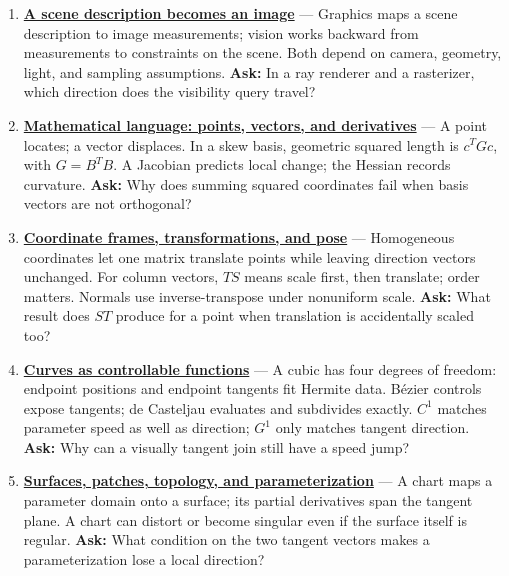 \begin{enumerate}
\def\labelenumi{\arabic{enumi}.}
\item
  \textbf{\href{Continuous\%20Notes/University\%20-\%20Worlds,\%20Images\%20and\%20Inference\%20-\%20Graphics,\%20Vision\%20and\%20Photography\#A\%20scene\%20description\%20becomes\%20an\%20image}{A scene description becomes an image}} --- Graphics maps a scene description to image measurements; vision works backward from measurements to constraints on the scene. Both depend on camera, geometry, light, and sampling assumptions. \textbf{Ask:} In a ray renderer and a rasterizer, which direction does the visibility query travel?
\item
  \textbf{\href{Continuous\%20Notes/University\%20-\%20Worlds,\%20Images\%20and\%20Inference\%20-\%20Graphics,\%20Vision\%20and\%20Photography\#Mathematical\%20language:\%20points,\%20vectors,\%20and\%20derivatives}{Mathematical language: points, vectors, and derivatives}} --- A point locates; a vector displaces. In a skew basis, geometric squared length is \(c^T Gc\), with \(G=B^TB\). A Jacobian predicts local change; the Hessian records curvature. \textbf{Ask:} Why does summing squared coordinates fail when basis vectors are not orthogonal?
\item
  \textbf{\href{Continuous\%20Notes/University\%20-\%20Worlds,\%20Images\%20and\%20Inference\%20-\%20Graphics,\%20Vision\%20and\%20Photography\#Coordinate\%20frames,\%20transformations,\%20and\%20pose}{Coordinate frames, transformations, and pose}} --- Homogeneous coordinates let one matrix translate points while leaving direction vectors unchanged. For column vectors, \(TS\) means scale first, then translate; order matters. Normals use inverse-transpose under nonuniform scale. \textbf{Ask:} What result does \(ST\) produce for a point when translation is accidentally scaled too?
\item
  \textbf{\href{Continuous\%20Notes/University\%20-\%20Worlds,\%20Images\%20and\%20Inference\%20-\%20Graphics,\%20Vision\%20and\%20Photography\#Curves\%20as\%20controllable\%20functions}{Curves as controllable functions}} --- A cubic has four degrees of freedom: endpoint positions and endpoint tangents fit Hermite data. Bézier controls expose tangents; de Casteljau evaluates and subdivides exactly. \(C^1\) matches parameter speed as well as direction; \(G^1\) only matches tangent direction. \textbf{Ask:} Why can a visually tangent join still have a speed jump?
\item
  \textbf{\href{Continuous\%20Notes/University\%20-\%20Worlds,\%20Images\%20and\%20Inference\%20-\%20Graphics,\%20Vision\%20and\%20Photography\#Surfaces,\%20patches,\%20topology,\%20and\%20parameterization}{Surfaces, patches, topology, and parameterization}} --- A chart maps a parameter domain onto a surface; its partial derivatives span the tangent plane. A chart can distort or become singular even if the surface itself is regular. \textbf{Ask:} What condition on the two tangent vectors makes a parameterization lose a local direction?

\end{enumerate}
